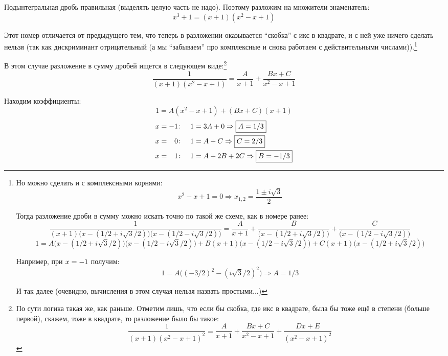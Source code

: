 \documentclass[a4paper,12pt]{article}
\begin{document}
  \begin{solution}
    Подынтегральная дробь правильная (выделять целую часть не надо).
    Поэтому разложим на множители знаменатель:
    \[
      x^3 + 1 = (x + 1)(x^2 - x + 1)
    \]

    Этот номер отличается от предыдущего тем, что теперь в разложении оказывается ``скобка'' с икс в квадрате, и с ней уже ничего сделать нельзя (так как дискриминант отрицательный (а мы ``забываем'' про комплексные и снова работаем с действительными числами)).\footnote{
      Но можно сделать и с комплексными корнями:
      \[
        x^2 - x + 1 = 0 \Rightarrow x_{1, 2} = \frac{1 \pm i \sqrt{3}}{2}
      \]

      Тогда разложение дроби в сумму можно искать точно по такой же схеме, как в номере ранее:  %
      \[
        \frac{1}{(x + 1)\bigl(x - (1/2 + i\sqrt{3}/2)\bigr)\bigl(x - (1/2 - i\sqrt{3}/2)\bigr)} = \frac{A}{x + 1} + \frac{B}{\bigl(x - (1/2 + i\sqrt{3}/2)\bigr)} + \frac{C}{\bigl(x - (1/2 - i\sqrt{3}/2)\bigr)}
      \]
      \[
        1 = A \bigl(x - (1/2 + i\sqrt{3}/2)\bigr) \bigl(x - (1/2 - i\sqrt{3}/2)\bigr) + B(x + 1)\bigl(x - (1/2 - i\sqrt{3}/2)\bigr) + C(x + 1)\bigl(x - (1/2 + i\sqrt{3}/2)\bigr)
      \]

      Например, при $x \hm= -1$ получим:
      \[
        1 = A\bigl((-3/2)^2 - (i\sqrt{3}/2)^2\bigr) \Rightarrow A = 1/3
      \]

      И так далее (очевидно, вычисления в этом случая нельзя назвать простыми...)
    }

    В этом случае разложение в сумму дробей ищется в следующем виде:\footnote{
      По сути логика такая же, как раньше.
      Отметим лишь, что если бы скобка, где икс в квадрате, была бы тоже ещё в степени (больше первой), скажем, тоже в квадрате, то разложение было бы такое:
      \[
        \frac{1}{(x + 1)(x^2 - x + 1)^2} = \frac{A}{x + 1} + \frac{Bx + C}{x^2 - x + 1} + \frac{Dx + E}{(x^2 - x + 1)^2}
      \]
    }
    \[
      \frac{1}{(x + 1)(x^2 - x + 1)} = \frac{A}{x + 1} + \frac{Bx + C}{x^2 - x + 1}
    \]

    Находим коэффициенты:
    \[
      1 = A (x^2 - x + 1) + (Bx + C) (x + 1)
    \]
    \[
      \begin{aligned}
        &x = -1\colon\quad 1 = 3A + 0 \Rightarrow \boxed{A = 1/3}\\
        &x = \hphantom{-}0\colon\quad 1 = A + C \Rightarrow \boxed{C = 2/3}\\
        &x = \hphantom{-}1\colon\quad 1 = A + 2B + 2C \Rightarrow \boxed{B = -1/3}
      \end{aligned}
    \]


\end{solution}
\end{document}

